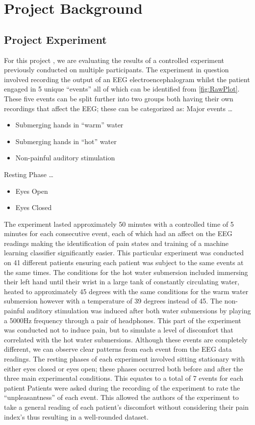 \documentclass[12pt]{article}
\begin{document}
\section{Project Background}
\subsection{Project Experiment}
For this project , we are evaluating the results of a controlled experiment previously conducted on multiple participants. The experiment in question involved recording the output of an EEG electroencephalogram whilst the patient engaged in 5 unique “events” all of which can be identified from \ref{fig:RawPlot}. These five events can be split further into two groups both having their own recordings that affect the EEG; these can be categorized as:
\newline
\newline
Major events
\dots
\begin{itemize}
\item Submerging hands in “warm” water
\item Submerging hands in “hot” water
\item Non-painful auditory stimulation
\end{itemize}
Resting Phase
\dots
\begin{itemize}
\item Eyes Open
\item Eyes Closed
\end{itemize}
The experiment lasted approximately 50 minutes with a controlled time of 5 minutes for each consecutive event, each of which had an affect on the EEG readings making the identification of pain states and training of a machine learning classifier significantly easier. This particular experiment was conducted on 41 different patients ensuring each patient was subject to the same events at the same times. The conditions for the hot water submersion included immersing their left hand until their wrist in a large tank of constantly circulating water, heated to approximately 45 degrees with the same conditions for the warm water submersion however with a temperature of 39 degrees instead of 45. The non-painful auditory stimulation was induced after both water submersions by playing a 5000Hz frequency through a pair of headphones. This part of the experiment was conducted not to induce pain, but to simulate a level of discomfort that correlated with the hot water submersions. Although these events are completely different, we can observe clear patterns from each event from the EEG data readings. The resting phases of each experiment involved sitting stationary with either eyes closed or eyes open; these phases occurred both before and after the three main experimental conditions. This equates to a total of 7 events for each patient Patients were asked during the recording of the experiment to rate the “unpleasantness” of each event. This allowed the authors of the experiment to take a general reading of each patient’s discomfort without considering their pain index’s thus resulting in a well-rounded dataset.
\end{document}
